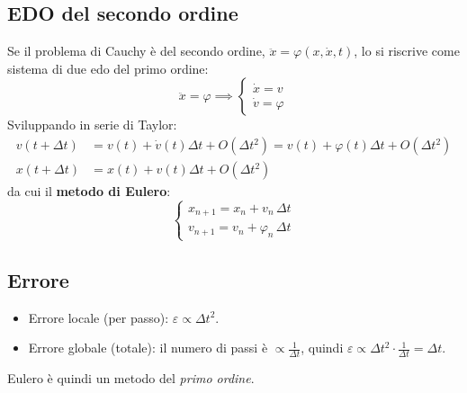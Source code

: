 \documentclass[11pt, a4paper, openright]{book}
\theoremstyle{plain}
\theoremstyle{definition}
\theoremstyle{remark}
\begin{document}
\subsection{EDO del secondo ordine}
Se il problema di Cauchy è del secondo ordine, $\ddot{x} = \varphi(x, \dot{x}, t)$, lo si riscrive come sistema di due edo del primo ordine:
\begin{equation}
    \ddot{x} = \varphi \implies \begin{cases}
        \dot{x} = v \\
        \dot{v} = \varphi
    \end{cases}
\end{equation}
Sviluppando in serie di Taylor:
\begin{align}
    v(t + \Delta t) &= v(t) + \dot{v}(t)\Delta t + O(\Delta t^2) = v(t) + \varphi(t)\Delta t + O(\Delta t^2) \\
    x(t + \Delta t) &= x(t) + v(t)\Delta t + O(\Delta t^2)
\end{align}
da cui il \textbf{metodo di Eulero}:
\begin{equation}
    \begin{cases}
        x_{n + 1} = x_n + v_n\,\Delta t \\
        v_{n + 1} = v_n + \varphi_n\,\Delta t
    \end{cases}
\end{equation}

\subsection{Errore}
\begin{itemize}
    \item Errore locale (per passo): $\varepsilon \propto \Delta t^2$.
    \item Errore globale (totale): il numero di passi è $\propto \frac{1}{\Delta t}$, quindi $\varepsilon \propto \Delta t^2 \cdot \frac{1}{\Delta t} = \Delta t$.
\end{itemize}
Eulero è quindi un metodo del \emph{primo ordine}.
\end{document}
